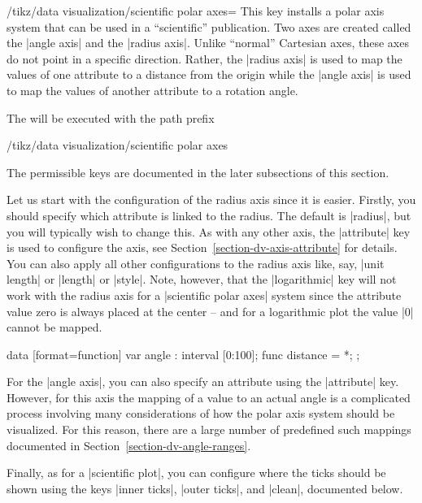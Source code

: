 \begin{key}{/tikz/data visualization/scientific polar axes=}
  This key installs a polar axis system that can be used in a
  ``scientific'' publication. Two axes are created called the
  |angle axis| and the |radius axis|. Unlike ``normal'' Cartesian
  axes, these axes do not point in a specific direction. Rather, the
  |radius axis| is used to map the values of one attribute to a
  distance from the origin while the |angle axis| is used to map the
  values of another attribute to a rotation angle.
  
  The  will be executed with the path prefix
\begin{codeexample}
/tikz/data visualization/scientific polar axes    
\end{codeexample}
  The permissible keys are documented in the later subsections of this
  section. 

  Let us start with the configuration of the radius axis since it is
  easier. Firstly, you should specify which attribute is linked to the
  radius. The default is |radius|, but you will typically wish to
  change this. As with any other axis, the |attribute| key is used to
  configure the axis, see Section~\ref{section-dv-axis-attribute} for
  details. You can also apply all other configurations to the radius
  axis like, say, |unit length| or |length| or |style|. Note, however,
  that the |logarithmic| key will not work with the radius axis for a
  |scientific polar axes| system since the attribute value zero is
  always placed at the center -- and for a logarithmic plot the value
  |0| cannot be mapped.
\begin{codeexample}[width=8.8cm]
\tikz \datavisualization [
  scientific polar axes,
  radius axis={
    attribute=distance,
    ticks={step=5000},
    padding=1.5em,
    length=3cm,
    grid
  },
  visualize as smooth line]
data [format=function] {
  var  angle : interval [0:100];
  func distance = \value{angle}*\value{angle};
};
\end{codeexample}

  For the |angle axis|, you can also specify an attribute using the
  |attribute| key. However, for this axis the mapping of a value to an
  actual angle is a complicated process involving many considerations
  of how the polar axis system should be visualized. For this reason,
  there are a large number of predefined such mappings documented in
  Section~\ref{section-dv-angle-ranges}.

  Finally, as for a |scientific plot|, you can configure where the
  ticks should be shown using the keys |inner ticks|, |outer ticks|,
  and |clean|, documented below.
\end{key}


